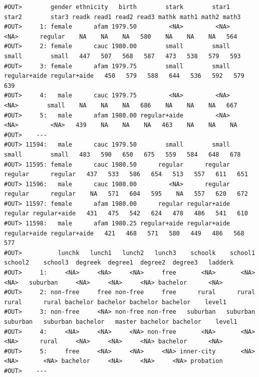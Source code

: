 \documentclass[]{book}
\begin{document}
\begin{verbatim}
#OUT>        gender ethnicity   birth        stark        star1        star2        star3 readk read1 read2 read3 mathk math1 math2 math3
#OUT>     1: female      afam 1979.50         <NA>         <NA>         <NA>      regular    NA    NA    NA   580    NA    NA    NA   564
#OUT>     2: female      cauc 1980.00        small        small        small        small   447   507   568   587   473   538   579   593
#OUT>     3: female      afam 1979.75        small        small regular+aide regular+aide   450   579   588   644   536   592   579   639
#OUT>     4:   male      cauc 1979.75         <NA>         <NA>         <NA>        small    NA    NA    NA   686    NA    NA    NA   667
#OUT>     5:   male      afam 1980.00 regular+aide         <NA>         <NA>         <NA>   439    NA    NA    NA   463    NA    NA    NA
#OUT>    ---                                                                                                                             
#OUT> 11594:   male      cauc 1979.50        small        small        small        small   483   590   650   675   559   584   648   678
#OUT> 11595: female      cauc 1980.50      regular      regular      regular      regular   437   533   586   654   513   557   611   651
#OUT> 11596:   male      cauc 1980.00         <NA>      regular      regular      regular    NA   571   604   595    NA   557   620   672
#OUT> 11597: female      afam 1980.00      regular regular+aide      regular regular+aide   431   475   542   624   478   486   541   610
#OUT> 11598:   male      afam 1980.25 regular+aide regular+aide regular+aide regular+aide   421   468   571   580   449   486   568   577
#OUT>          lunchk   lunch1   lunch2   lunch3    schoolk    school1    school2    school3  degreek  degree1  degree2  degree3   ladderk
#OUT>     1:     <NA>     <NA>     <NA>     free       <NA>       <NA>       <NA>   suburban     <NA>     <NA>     <NA> bachelor      <NA>
#OUT>     2: non-free     free non-free     free      rural      rural      rural      rural bachelor bachelor bachelor bachelor    level1
#OUT>     3: non-free     <NA> non-free non-free   suburban   suburban   suburban   suburban bachelor   master bachelor bachelor    level1
#OUT>     4:     <NA>     <NA>     <NA> non-free       <NA>       <NA>       <NA>      rural     <NA>     <NA>     <NA> bachelor      <NA>
#OUT>     5:     free     <NA>     <NA>     <NA> inner-city       <NA>       <NA>       <NA> bachelor     <NA>     <NA>     <NA> probation
#OUT>    ---                                                                                                                              

\end{verbatim}
\end{document}
